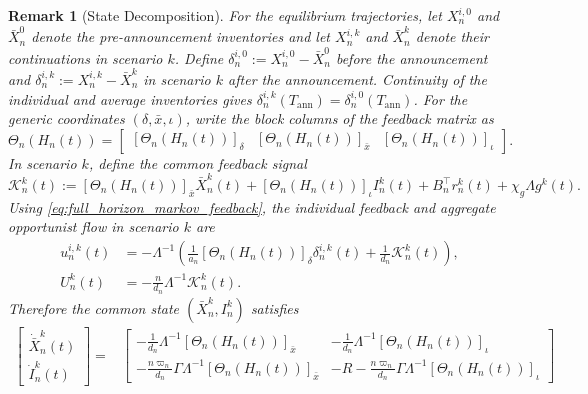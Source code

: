 \documentclass[12pt]{article}
\numberwithin{equation}{section}
\newtheorem{remark}[theorem]{Remark}
\theoremstyle{definition}
\begin{document}
\begin{remark}[State Decomposition]\label{rem:full_procedure_decomposition}
For the equilibrium trajectories, let \(X_n^{i,0}\) and \(\bar X_n^0\)
denote the pre-announcement inventories and let \(X_n^{i,k}\) and
\(\bar X_n^k\) denote their continuations in scenario \(k\). Define
\(\delta_n^{i,0}:=X_n^{i,0}-\bar X_n^0\) before the announcement and
\(\delta_n^{i,k}:=X_n^{i,k}-\bar X_n^k\) in scenario \(k\) after the
announcement. Continuity of
the individual and average inventories gives
\(\delta_n^{i,k}(T_{\mathrm{ann}})=\delta_n^{i,0}(T_{\mathrm{ann}})\).
For the generic coordinates \((\delta,\bar x,\iota)\), write the block columns
of the feedback matrix as
\begin{equation}\label{eq:fixed_interval_theta_partition}
\Theta_n(H_n(t))
=
\begin{bmatrix}
[\Theta_n(H_n(t))]_{\delta}&
[\Theta_n(H_n(t))]_{\bar x}&
[\Theta_n(H_n(t))]_{\iota}
\end{bmatrix}.
\end{equation}
In scenario \(k\), define the common feedback signal
\begin{equation}\label{eq:post_ann_common_feedback_signal}
\mathcal K_n^k(t)
:=
[\Theta_n(H_n(t))]_{\bar x}\bar X_n^k(t)
+[\Theta_n(H_n(t))]_{\iota}I_n^k(t)
+B_n^\top r_n^k(t)+\chi_g\Lambda g^k(t).
\end{equation}
Using \eqref{eq:full_horizon_markov_feedback}, the individual feedback and
aggregate opportunist flow in scenario \(k\) are
\begin{align}
u_n^{i,k}(t)
&=
-\Lambda^{-1}
\left(
\frac1{a_n}[\Theta_n(H_n(t))]_{\delta}\delta_n^{i,k}(t)
+\frac1{d_n}\mathcal K_n^k(t)
\right),
\label{eq:post_ann_feedback_decomposition}\\
U_n^{k}(t)
&=
-\frac{n}{d_n}\Lambda^{-1}\mathcal K_n^k(t).
\label{eq:post_ann_total_flow_decomposition}
\end{align}
Therefore the common state \((\bar X_n^k,I_n^k)\) satisfies
\begin{align}
\begin{bmatrix}
\dot{\bar X}_n^k(t)\\
\dot I_n^k(t)
\end{bmatrix}
={}&
\begin{bmatrix}
-\frac1{d_n}\Lambda^{-1}[\Theta_n(H_n(t))]_{\bar x}
&
-\frac1{d_n}\Lambda^{-1}[\Theta_n(H_n(t))]_{\iota}
\\[5pt]
-\frac{n\varpi_n}{d_n}\Gamma\Lambda^{-1}[\Theta_n(H_n(t))]_{\bar x}
&
-R-\frac{n\varpi_n}{d_n}\Gamma\Lambda^{-1}[\Theta_n(H_n(t))]_{\iota}

\end{bmatrix}
\end{align}
\end{remark}
\end{document}
